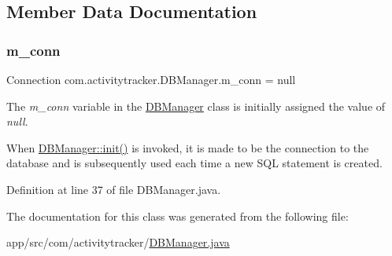 \subsection{Member Data Documentation}
\mbox{\label{classcom_1_1activitytracker_1_1_d_b_manager_a064088d13ac09eb147fdc19268771521}} 
\subsubsection{\texorpdfstring{m\+\_\+conn}{m\_conn}}
{\footnotesize\ttfamily Connection com.\+activitytracker.\+D\+B\+Manager.\+m\+\_\+conn = null\hspace{0.3cm}{\ttfamily [private]}}

The {\itshape m\+\_\+conn} variable in the \mbox{\hyperlink{classcom_1_1activitytracker_1_1_d_b_manager}{D\+B\+Manager}} class is initially assigned the value of {\itshape null}.

When \mbox{\hyperlink{classcom_1_1activitytracker_1_1_d_b_manager_a41df4600bb5901a26a4ea6a7108a70b9}{D\+B\+Manager\+::init()}} is invoked, it is made to be the connection to the database and is subsequently used each time a new S\+QL statement is created. 

Definition at line 37 of file D\+B\+Manager.\+java.



The documentation for this class was generated from the following file\+:\begin{DoxyCompactItemize}
\item 
app/src/com/activitytracker/\mbox{\hyperlink{_d_b_manager_8java}{D\+B\+Manager.\+java}}\end{DoxyCompactItemize}
